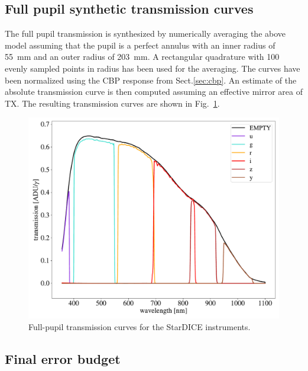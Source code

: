 \subsection{Full pupil synthetic transmission curves}

The full pupil transmission is synthesized by numerically averaging
the above model assuming that the pupil is a perfect annulus with an
inner radius of \SI{55}{mm} and an outer radius of \SI{203}{mm}. A
rectangular quadrature with 100 evenly sampled points in radius has
been used for the averaging. The curves have been normalized using the
CBP response from Sect.\ref{sec:cbp}. An estimate of the
absolute transmission curve is then computed assuming an effective
mirror area of TX. The resulting transmission curves are shown in
Fig.~\ref{fig:fullpupiltrans}.
\begin{figure}
  \centering
  \includegraphics[width=1\linewidth]{fig/fullpupill.pdf}
  \caption{Full-pupil transmission curves for the StarDICE instruments.}
  \label{fig:fullpupiltrans}
\end{figure}


\subsection{Final error budget}

